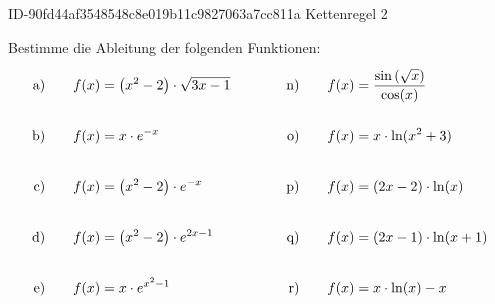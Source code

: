 \begin{exercise}
      {ID-90fd44af3548548c8e019b11c9827063a7cc811a}
      {Kettenregel 2}
  \ifproblem\problem\par
    Bestimme die Ableitung der folgenden Funktionen:
    \begingroup
      \newcommand{\vstrut}{\rule[-3.5ex]{0pt}{7.5ex}}%
      \newcommand{\xca}{f(x)&=\left(x^{2}-2\right)\cdot\sqrt{3x-1}}%
      \newcommand{\xcb}{f(x)&=x\cdot e^{-x}}%
      \newcommand{\xcc}{f(x)&=\left(x^{2}-2\right)\cdot e^{-x}}%
      \newcommand{\xcd}{f(x)&=\left(x^{2}-2\right)\cdot e^{2x-1}}%
      \newcommand{\xce}{f(x)&=x\cdot e^{x^{2}-1}}%
      \newcommand{\xcf}{f(x)&=x^{2}\cdot e^{-kx}}%
      \newcommand{\xcg}{f(x)&=\frac{4e^{x}}{\left(e^{x}+1\right)^{2}}}%
      \newcommand{\xch}{f(x)&=\left(2x^{2}+3\right)\cdot3^{x}}%
      \newcommand{\xci}{f(x)&=x^{x}}%
      \newcommand{\xcj}{f(x)&=\left(x^{2}+x^{3}\right)^{\sqrt{x}}}%
      \newcommand{\xck}{f(x)&=x+\sin(1-kx)}%
      \newcommand{\xcl}{f(x)&=ax^{2}\cdot\cos(kx)}%
      \newcommand{\xcm}{f(x)&=\tan^{4}(x)}%
      \newcommand{\xcn}{f(x)&=\frac{\sin\left(\sqrt{x}\right)}{\cos(x)}}%
      \newcommand{\xco}{f(x)&=x\cdot\ln(x^{2}+3)}%
      \newcommand{\xcp}{f(x)&=(2x-2)\cdot\ln(x)}%
      \newcommand{\xcq}{f(x)&=(2x-1)\cdot\ln(x+1)}%
      \newcommand{\xcr}{f(x)&=x\cdot\ln(x)-x}%
      \newcommand{\xcs}{f(x)&=\ln\left(\frac{x+1}{x^{2}}\right)}%
      \newcommand{\xct}{f(x)&=\frac{1}{2}\cdot(x-\ln(x))}%
      \newcommand{\xcu}{f(x)&=\frac{1+\ln(x)}{x}}%
      \newcommand{\xcv}{f(x)&=\ln\left(\frac{x+1}{1-x}\right)}%
      \newcommand{\xcw}{f(x)&=\sqrt{\ln(x)}\cdot\ln\left(\frac{1}{x}\right)}%
      \newcommand{\xcx}{f(x)&=\log_{3}(3x+1)}%
      \newcommand{\xcy}{f(x)&=\log_{2}\left(\sin\left(2\pi x\right)\cdot\cos\left(x^{2}\right)\right)}%
      \newcommand{\xcz}{f(x)&=\sin\left(\cos\left(\ln\left(\sqrt{e^{x+2}}\right)\right)\right)}%
      \allowdisplaybreaks
      \begin{alignat*}{5}
        \text{a)\vstrut}&\quad & \xca & \quad&\quad & \text{n)\vstrut}&\quad & \xcn \\
        \text{b)\vstrut}&\quad & \xcb & \quad&\quad & \text{o)\vstrut}&\quad & \xco \\
        \text{c)\vstrut}&\quad & \xcc & \quad&\quad & \text{p)\vstrut}&\quad & \xcp \\
        \text{d)\vstrut}&\quad & \xcd & \quad&\quad & \text{q)\vstrut}&\quad & \xcq \\
        \text{e)\vstrut}&\quad & \xce & \quad&\quad & \text{r)\vstrut}&\quad & \xcr \\

\end{alignat*}
\end{exercise}
